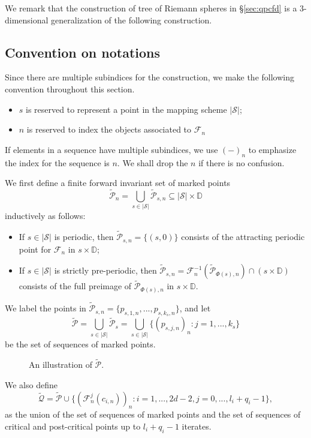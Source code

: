 \documentclass[11pt, reqno]{amsart}
\newcommand{\incfig}[1]{%
    \def\svgwidth{\columnwidth}
    {#1.pdf_tex}
}
\numberwithin{equation}{section}
\theoremstyle{plain}
\theoremstyle{theorem}
\theoremstyle{definition}
\newcommand{\D}{\mathbb{D}}
\newcommand{\bp}{\mathcal{F}}
\numberwithin{figure}{section}
\begin{document}
We remark that the construction of tree of Riemann spheres in \S \ref{sec:qpcfd} is a $3$-dimensional generalization of the following construction.

\subsection*{Convention on notations}
Since there are multiple subindices for the construction, we make the following convention throughout this section.
\begin{itemize}
\item $s$ is reserved to represent a point in the mapping scheme $|\mathcal{S}|$;
\item $n$ is reserved to index the objects associated to $\mathcal{F}_n$
\end{itemize}
If elements in a sequence have multiple subindices, we use $(-)_n$ to emphasize the index for the sequence is $n$. We shall drop the $n$ if there is no confusion.

We first define a finite forward invariant set of marked points 
$$
\widetilde{\mathcal{P}}_n = \bigcup_{s\in |\mathcal{S}|} \widetilde{\mathcal{P}}_{s,n} \subseteq |\mathcal{S}|\times \D
$$ 
inductively as follows:
\begin{itemize}
\item If $s\in |\mathcal{S}|$ is periodic, then $\widetilde{\mathcal{P}}_{s,n} = \{(s,0)\}$ consists of the attracting periodic point for $\bp_n$ in $s \times \D$;
\item If $s\in |\mathcal{S}|$ is strictly pre-periodic, then $\widetilde{\mathcal{P}}_{s,n} =  \bp_n^{-1}(\widetilde{\mathcal{P}}_{\Phi(s),n}) \cap (s\times \D)$ consists of the full preimage of $\widetilde{\mathcal{P}}_{\Phi(s),n}$ in $s \times \D$.
\end{itemize}
We label the points in $\widetilde{\mathcal{P}}_{s,n} = \{p_{s,1,n},..., p_{s,k_s,n}\}$, and let
$$
\widetilde{\mathcal{P}} = \bigcup_{s\in |\mathcal{S}|} \widetilde{\mathcal{P}}_s = \bigcup_{s\in |\mathcal{S}|} \{(p_{s,j,n})_n: j=1,..., k_s\}
$$
be the set of sequences of marked points.

\begin{figure}[ht]
  \centering
  \resizebox{0.6\linewidth}{!}{
  \incfig{MarkedP}
  }
  \caption{An illustration of $\widetilde{\mathcal{P}}$.}
  \label{fig:MarkedP}
\end{figure}

We also define
$$
\widetilde{\mathcal{Q}} = \widetilde{\mathcal{P}} \cup \{(\bp_n^j(c_{i,n}))_n: i = 1,..., 2d-2, j = 0,..., l_i+q_i-1\},
$$
as the union of the set of sequences of marked points and the set of sequences of critical and post-critical points up to $l_i+q_i-1$ iterates.
\end{document}
